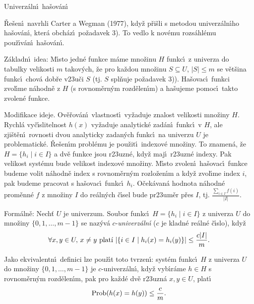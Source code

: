 \heading
Univerz\'aln\'\i\ ha\v sov\'an\'\i
\endheading

\flushpar\v Re\v sen\'\i\ navrhli Carter a Wegman (1977), kdy\v z p\v ri\v sli s 
metodou univerz\'aln\'\i ho ha\v sov\'an\'\i , kter\'a obch\'az\'\i\ po\v za\-davek 3).  
To vedlo k nov\'emu rozs\'ahl\'emu pou\v z\'\i v\'an\'\i\ ha\v sov\'an\'\i .  
\medskip

\flushpar Z\'akladn\'\i\ idea: M\'\i sto jedn\'e funkce m\'ame 
mno\v zinu $H$ funkc\'\i\ z univerza do tabulky velikosti $m$ 
takov\'ych, \v ze pro ka\v zdou mno\v zinu $S\subseteq U$, $|S|\le 
m$ se 
v\v et\v sina funkc\'\i\ chov\'a dob\v re v\accent23u\v ci $S$ (tj. $
S$ 
spl\v nuje po\v zadavek 3)). Ha\v sovac\'\i\ funkci 
zvol\'\i me n\'ahodn\v e z $H$ (s rovnom\v ern\'ym rozd\v elen\'\i m) a ha\v sujeme  
pomoc\'\i\ takto zvo\-len\'e funkce. 
\medskip

\flushpar Modifikace ideje. Ov\v e\v rov\'an\'\i\ vlastnost\'\i\ vy\v zaduje 
znalost velikosti mno\v ziny $H$. Rychl\'a vy\v c\'\i slitelnost $
h(x)$ 
vy\v zaduje ana\-lytick\'e zad\'an\'\i\ funkc\'\i\ v $H$, ale zji\v st\v en\'\i\ rovnosti 
dvou analy\-ticky zadan\'ych funkc\'\i\ na univerzu $U$ je 
problematick\'e. \v Re\v sen\'\i m probl\'emu je pou\v zit\'\i\ indexov\'e mno\v ziny. 
To znamen\'a, \v ze $H=\{h_i\mid i\in I\}$ a dv\v e funkce jsou r\accent23uzn\'e, 
kdy\v z maj\'\i\ r\accent23uzn\'e indexy. Pak velikost syst\'emu bude 
velikost indexov\'e mno\v ziny. M\'\i sto zvolen\'\i\ ha\v sovac\'\i\ funkce 
budeme volit n\'ahodn\v e index s rovnom\v ern\'ym rozlo\v zen\'\i m a kdy\v z 
zvol\'\i me index $i$, pak budeme pracovat s ha\v sovac\'\i\ funkc\'\i\ $
h_i$. 
O\v cek\'avan\'a hodnota n\'ahodn\'e prom\v enn\'e $f$ z mno\v ziny $
I$ do 
re\'aln\'ych \v c\'\i sel bude pr\accent23um\v er p\v res $I$, tj. $\frac {
\sum_{i\in I}f(i)}{|I|}$.

\flushpar Form\'aln\v e: Nech\v t  $U$ je univerzum. Soubor  
funkc\'\i\ $H=\{h_i\mid i\in I\}$ z univerza $U$ do mno\v ziny $\{
0,1,\dots,m-1\}$ se 
naz\'yv\'a $c$-\emph{univerz\'aln\'\i} ($c$ je kladn\'e re\'aln\'e \v c\'\i slo), 
kdy\v z 
$$\forall x,y\in U,\,x\ne y\text{\rm\ plat\'\i\ }|\{i\in I\mid h_
i(x)=h_i(y)\}|\le\frac {c|I|}m.$$
\medskip

Jako ekvivalentn\'\i\ definici lze pou\v z\'\i t toto tvrzen\'\i: syst\'em funkc\'\i\ $H$ z univerza $U$ do mno\v ziny $\{0,1,\dots,m-1\}$ je $c$-univerz\'aln\'\i ,
kdy\v z vyb\'\i r\'ame $h\in H$ s rovnom\v ern\'ym rozd\v elen\'\i m, pak pro 
ka\v zd\'e dv\v e r\accent23uzn\'a $x,y\in U$, plat\'\i\ 
$$\operatorname{Prob}(h(x)=h(y))\le\frac cm.$$


